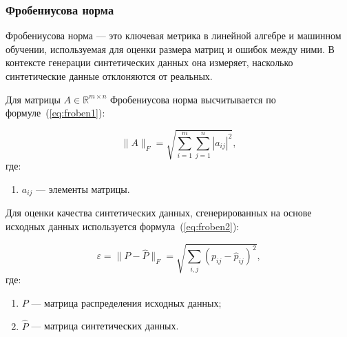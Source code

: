 \subsubsection{Фробениусова норма}
Фробениусова норма --- это ключевая метрика в линейной алгебре и машинном обучении, используемая для оценки размера матриц и ошибок между ними.
В контексте генерации синтетических данных она измеряет, насколько синтетические данные отклоняются от реальных.

Для матрицы \( A \in \mathbb{R}^{m \times n} \) Фробениусова норма высчитывается по формуле~(\ref{eq:froben1}):

\begin{equation}\label{eq:froben1}
	\|A\|_F = \sqrt{\sum_{i=1}^{m}\sum_{j=1}^{n} |a_{ij}|^2},
\end{equation}
где:
\begin{enumerate}[label*=---]
	\item  \( a_{ij} \) --- элементы матрицы.
\end{enumerate}
\newpage
Для оценки качества синтетических данных, сгенерированных на основе исходных данных используется формула~(\ref{eq:froben2}):

\begin{equation}\label{eq:froben2}
	\varepsilon = \|P - \hat{P}\|_F = \sqrt{\sum_{i,j}(p_{ij} - \hat{p}_{ij})^2},
\end{equation}
где:
\begin{enumerate}[label*=---]
	\item \( P \) --- матрица распределения исходных данных;
	\item \( \hat{P} \) --- матрица синтетических данных.
	
\end{enumerate}







